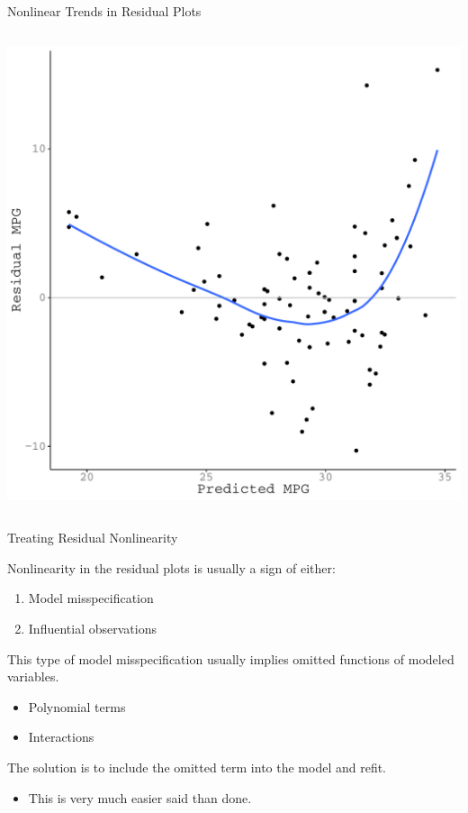 \documentclass[10pt]{beamer}\usepackage[]{graphicx}\usepackage[]{color}
\makeatletter
\def\maxwidth{ %
  \ifdim\Gin@nat@width>\linewidth
    \linewidth
  \else
    \Gin@nat@width
  \fi
}
\newenvironment{knitrout}{}{} %
\makeatother
\begin{document}
{\begin{frame}{Nonlinear Trends in Residual Plots}
\begin{columns}
\begin{column}{0.5\textwidth}
\begin{knitrout}
{\centering \includegraphics[width=\maxwidth]{figure/assumptions-unnamed-chunk-14-1} 

}


\end{knitrout}

\end{column}
\end{columns}

\end{frame}

\watermarkon %

\begin{frame}{Treating Residual Nonlinearity}

  Nonlinearity in the residual plots is usually a sign of either:
  \begin{enumerate}
  \item Model misspecification
  \item Influential observations
  \end{enumerate}
  \vb
  This type of model misspecification usually implies omitted functions of
  modeled variables.
  \begin{itemize}
  \item Polynomial terms
  \item Interactions
  \end{itemize}
  \vb
  The solution is to include the omitted term into the model and refit.
  \begin{itemize}
  \item This is very much easier said than done.
  \end{itemize}


\end{frame}}
\end{document}
